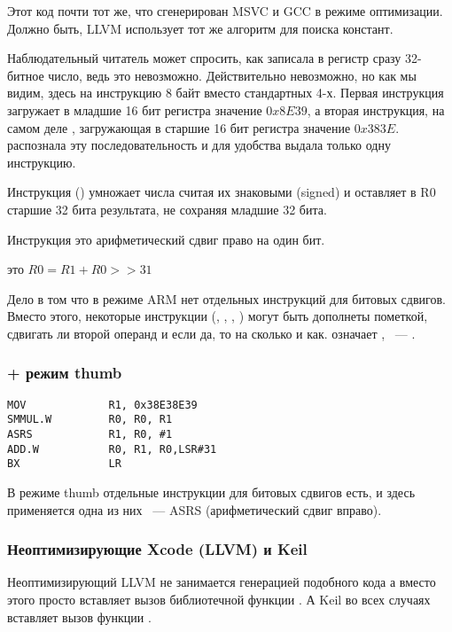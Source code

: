 Этот код почти тот же, что сгенерирован MSVC и GCC в режиме оптимизации. Должно быть, LLVM использует тот же
алгоритм для поиска констант.

Наблюдательный читатель может спросить, как \MOV записала в регистр сразу 32-битное число, ведь это невозможно.
Действительно невозможно, но как мы видим, здесь на инструкцию 8 байт вместо стандартных 4-х.
Первая инструкция загружает в младшие 16 бит регистра значение $0x8E39$, а вторая инструкция, 
на самом деле ,
загружающая в старшие 16 бит регистра значение $0x383E$. \IDA распознала эту последовательность и для удобства
выдала только одну инструкцию.

Инструкция  () умножает числа считая их знаковыми (signed)
и оставляет в R0 старшие 32 бита результата, не сохраняя младшие 32 бита.

Инструкция  это арифметический сдвиг право на один бит.

 это $R0=R1 + R0>>31$

\label{shifts_in_ARM_mode}
Дело в том что в режиме ARM нет отдельных инструкций для битовых сдвигов. 
Вместо этого, некоторые инструкции (\MOV, \ADD,
\SUB, ) могут быть
дополнеты пометкой, сдвигать ли второй операнд и если да, то на сколько и как. 
 означает ,  ~--- .

\subsubsection{\OptimizingXcode + режим thumb}

\begin{lstlisting}
MOV             R1, 0x38E38E39
SMMUL.W         R0, R0, R1
ASRS            R1, R0, #1
ADD.W           R0, R1, R0,LSR#31
BX              LR
\end{lstlisting}

В режиме thumb отдельные инструкции для битовых сдвигов есть, и здесь применяется одна из них ~--- ASRS 
(арифметический сдвиг вправо).

\subsubsection{Неоптимизирующие Xcode (LLVM) и Keil}

Неоптимизирующий LLVM не занимается генерацией подобного кода а вместо этого просто вставляет вызов
библиотечной функции . А Keil во всех случаях вставляет вызов функции .

